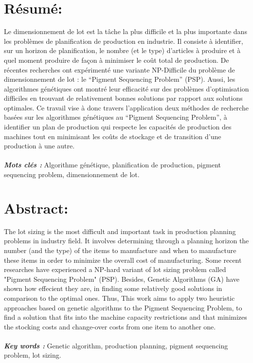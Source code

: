 \documentclass[12pt,a4paper]{article}
\begin{document}
	\section*{Résumé:}
	
	\vspace{1cm}
	
	Le dimensionnement de lot est la tâche la plus difficile et la plus importante dans les problèmes de planification de production en industrie. Il consiste à identifier, sur un horizon de planification, le nombre (et le type) d’articles à produire et à quel moment produire de façon à minimiser le coût total de production. De récentes recherches ont expérimenté une variante NP-Difficile du problème de dimensionnement de lot : le “Pigment Sequencing Problem” (PSP). Aussi, les algorithmes génétiques ont montré leur efficacité sur des problèmes d’optimisation difficiles en trouvant de relativement bonnes solutions par rapport aux solutions optimales. Ce travail vise à donc travers l'application deux méthodes de recherche basées sur les algorithmes génétiques au “Pigment Sequencing Problem”, à identifier un plan de production qui respecte les capacités de production des machines tout en minimisant les coûts de stockage et de transition d’une production à une autre. \\
	\\
	\hspace*{.5cm}\textsl{\textbf{Mots clés :}} Algorithme génétique, planification de production, pigment sequencing problem, dimensionnement de lot.
	
	\newpage %
	
	\section*{Abstract:}
	
	\vspace{1cm}
	
	The lot sizing is the most difficult and important task in production planning problems in industry field. It involves determining through a planning horizon the number (and the type) of the items to manufacture and when to manufacture these items in order to minimize the overall cost of manufacturing. Some recent researches have experienced a NP-hard variant of lot sizing problem called "Pigment Sequencing Problem" (PSP). Besides, Genetic Algorithms (GA) have shown how effecient they are, in finding some relatively good solutions in comparison to the optimal ones. Thus, This work aims to apply two heuristic approaches based on genetic algorithms to the Pigment Sequencing Problem, to find a solution that fits into the machine capacity restrictions and that minimizes the stocking costs and change-over costs from one item to another one.\\
	\\
	\hspace*{.5cm}\textsl{\textbf{Key words :}} Genetic algorithm, production planning, pigment sequencing problem, lot sizing.
	
\end{document}
